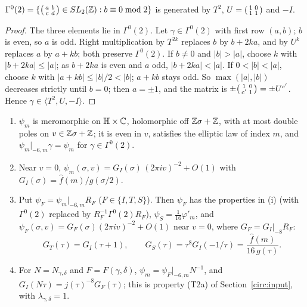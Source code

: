 \begin{lemma}\label{tr:lem:gamma02}
$\Gamma^0(2)=\{\begin{psmallmatrix}a&b\\c&d\end{psmallmatrix}\in SL_2(\mathbb{Z}):b\equiv0\bmod2\}$ is generated by $T^2$, $U=\begin{psmallmatrix}1&0\\1&1\end{psmallmatrix}$ and $-I$.
\end{lemma}

\begin{proof}
The three elements lie in $\Gamma^0(2)$. Let $\gamma\in\Gamma^0(2)$ with first row $(a,b)$; $b$ is even, so $a$ is odd. Right multiplication by $T^{2k}$ replaces $b$ by $b+2ka$, and by $U^k$ replaces $a$ by $a+kb$; both preserve $\Gamma^0(2)$. If $b\ne0$ and $|b|>|a|$, choose $k$ with $|b+2ka|\le|a|$; as $b+2ka$ is even and $a$ odd, $|b+2ka|<|a|$. If $0<|b|<|a|$, choose $k$ with $|a+kb|\le|b|/2<|b|$; $a+kb$ stays odd. So $\max(|a|,|b|)$ decreases strictly until $b=0$; then $a=\pm1$, and the matrix is $\pm\begin{psmallmatrix}1&0\\c'&1\end{psmallmatrix}=\pm U^{c'}$. Hence $\gamma\in\langle T^2,U,-I\rangle$.
\end{proof}

\begin{proposition}\label{tr:prop:jacobi}
\begin{enumerate}
\item[(i)] $\psi_m$ is meromorphic on $\mathbb{H}\times\mathbb{C}$, holomorphic off $\mathbb{Z}\sigma+\mathbb{Z}$, with at most double poles on $v\in\mathbb{Z}\sigma+\mathbb{Z}$; it is even in $v$, satisfies the elliptic law of index $m$, and $\psi_m|_{-6,m}\gamma=\psi_m$ for $\gamma\in\Gamma^0(2)$.
\item[(ii)] Near $v=0$, $\psi_m(\sigma,v)=G_I(\sigma)\,(2\pi iv)^{-2}+O(1)$ with $G_I(\sigma)=\hat f(m)/g(\sigma/2)$.
\item[(iii)] Put $\psi_F=\psi_m|_{-6,m}R_F$ \textup($F\in\{I,T,S\}$\textup). Then $\psi_F$ has the properties in \textup{(i)} \textup(with $\Gamma^0(2)$ replaced by $R_F^{-1}\Gamma^0(2)R_F$\textup), $\psi_S=\frac1{16}\varphi'_m$, and $\psi_F(\sigma,v)=G_F(\sigma)(2\pi iv)^{-2}+O(1)$ near $v=0$, where $G_F=G_I|_{-8}R_F$:
\[
G_T(\tau)=G_I(\tau+1),\qquad G_S(\tau)=\tau^8G_I(-1/\tau)=\frac{\hat f(m)}{16\,g(\tau)} .
\]
\item[(iv)] For $N=N_{\gamma,\delta}$ and $F=F(\gamma,\delta)$, $\psi_m=\psi_F|_{-6,m}N^{-1}$, and $G_I(N\tau)=j(\tau)^{-8}G_F(\tau)$; this is property \textup{(T2a)} of Section~\ref{circ:input}, with $\lambda_{\gamma,\delta}=1$.
\end{enumerate}
\end{proposition}

